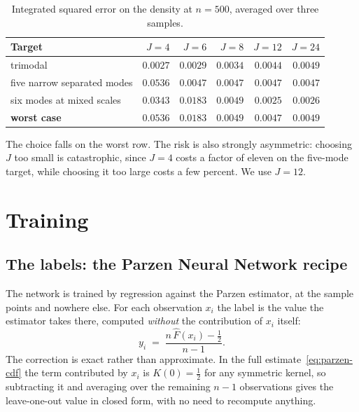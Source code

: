 \documentclass[11pt]{article}
\newcommand{\Fhat}{\widehat{F}}
\begin{document}
\begin{table}[H]
\centering
\begin{tabular}{@{}lrrrrr@{}}
\toprule
\textbf{Target} & $J = 4$ & $J = 6$ & $J = 8$ & $J = 12$ & $J = 24$ \\
\midrule
trimodal & $\mathbf{0.0027}$ & $0.0029$ & $0.0034$ & $0.0044$ & $0.0049$ \\
five narrow separated modes & $0.0536$ & $0.0047$ & $0.0047$ & $\mathbf{0.0047}$ & $0.0047$ \\
six modes at mixed scales & $0.0343$ & $0.0183$ & $0.0049$ & $\mathbf{0.0025}$ & $0.0026$ \\
\midrule
\textbf{worst case} & $0.0536$ & $0.0183$ & $0.0049$ & $\mathbf{0.0047}$ & $0.0049$ \\
\bottomrule
\end{tabular}
\caption{Integrated squared error on the density at $n = 500$, averaged over three samples.}
\label{tab:capacity}
\end{table}

The choice falls on the worst row. The risk is also strongly asymmetric: choosing $J$ too
small is catastrophic, since $J = 4$ costs a factor of eleven on the five-mode target, while
choosing it too large costs a few percent. We use $J = 12$.

\section{Training}
\label{sec:training}

\subsection{The labels: the Parzen Neural Network recipe}

The network is trained by regression against the Parzen estimator, at the sample points and
nowhere else. For each observation $x_i$ the label is the value the estimator takes there,
computed \emph{without} the contribution of $x_i$ itself:
\begin{equation}
y_i \;=\; \frac{n\,\Fhat(x_i) - \tfrac12}{n - 1}.
\label{eq:loo}
\end{equation}
The correction is exact rather than approximate. In the full estimate~\eqref{eq:parzen-cdf}
the term contributed by $x_i$ is $K(0) = \tfrac12$ for any symmetric kernel, so subtracting it
and averaging over the remaining $n-1$ observations gives the leave-one-out value in closed
form, with no need to recompute anything.
\end{document}
